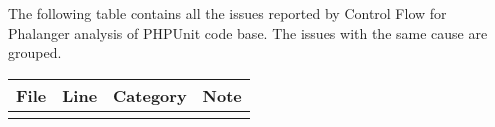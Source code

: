 
\label{phpunittable}The following table contains all the issues 
reported by Control Flow for Phalanger analysis 
of PHPUnit code base. The issues with the same 
cause are grouped.
    \begin{longtable}{| l | l | l | p{6cm} |}
    
    \hline 
    \textbf{File} &   \textbf{Line}    &   \textbf{Category}       &   \textbf{Note}  \\ \hline 
    \endfirsthead
    
    \endhead

    \endfoot

    \endlastfoot    
    

\end{longtable}
